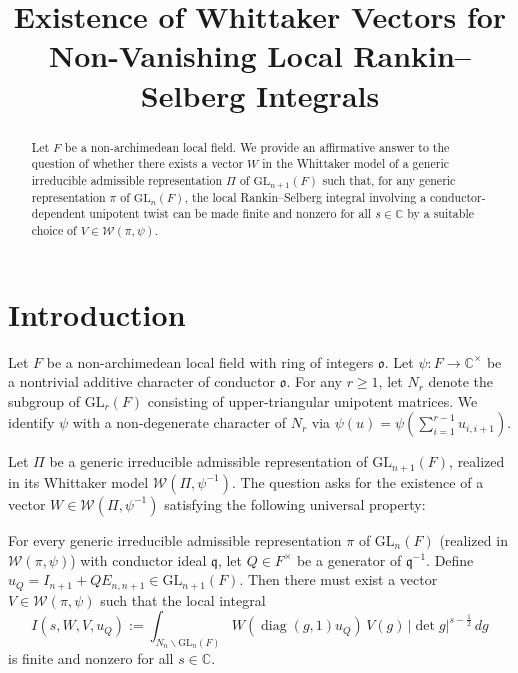 \documentclass[12pt]{article}
\theoremstyle{plain}
\theoremstyle{definition}
\newcommand{\GL}{\mathrm{GL}}
\newcommand{\diag}{\operatorname{diag}}
\begin{document}
\title{Existence of Whittaker Vectors for Non-Vanishing Local Rankin--Selberg Integrals}
\author{}
\date{}
\maketitle

\begin{abstract}
Let $F$ be a non-archimedean local field. We provide an affirmative answer to the question of whether there exists a vector $W$ in the Whittaker model of a generic irreducible admissible representation $\Pi$ of $\GL_{n+1}(F)$ such that, for any generic representation $\pi$ of $\GL_n(F)$, the local Rankin--Selberg integral involving a conductor-dependent unipotent twist can be made finite and nonzero for all $s \in \mathbb{C}$ by a suitable choice of $V \in \mathcal{W}(\pi, \psi)$.
\end{abstract}

\section{Introduction}

Let $F$ be a non-archimedean local field with ring of integers $\mathfrak{o}$. Let $\psi: F \to \mathbb{C}^\times$ be a nontrivial additive character of conductor $\mathfrak{o}$. For any $r \geq 1$, let $N_r$ denote the subgroup of $\GL_r(F)$ consisting of upper-triangular unipotent matrices. We identify $\psi$ with a non-degenerate character of $N_r$ via $\psi(u) = \psi(\sum_{i=1}^{r-1} u_{i, i+1})$.

Let $\Pi$ be a generic irreducible admissible representation of $\GL_{n+1}(F)$, realized in its Whittaker model $\mathcal{W}(\Pi, \psi^{-1})$. The question asks for the existence of a vector $W \in \mathcal{W}(\Pi, \psi^{-1})$ satisfying the following universal property:

For every generic irreducible admissible representation $\pi$ of $\GL_n(F)$ (realized in $\mathcal{W}(\pi, \psi)$) with conductor ideal $\mathfrak{q}$, let $Q \in F^\times$ be a generator of $\mathfrak{q}^{-1}$. Define $u_Q = I_{n+1} + Q E_{n, n+1} \in \GL_{n+1}(F)$. Then there must exist a vector $V \in \mathcal{W}(\pi, \psi)$ such that the local integral
\begin{equation} \label{eq:integral}
I(s, W, V, u_Q) := \int_{N_n \backslash \GL_n(F)} W(\diag(g, 1) u_Q)\, V(g)\, |\det g|^{s-\frac{1}{2}}\, dg
\end{equation}
is finite and nonzero for all $s \in \mathbb{C}$.
\end{document}
